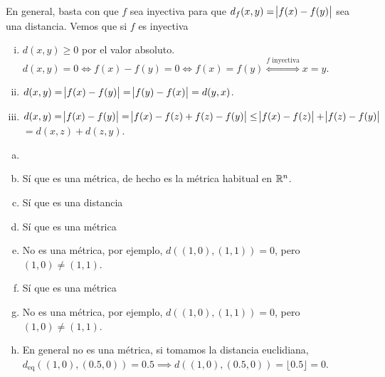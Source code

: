 \begin{eje}
    En general, basta con que $f$ sea inyectiva para que $d_f(x,y) = \abs{f(x) - f(y)}$ sea una distancia. Vemos que si $f$ es inyectiva
    \begin{enumerate}[i)]
        \item $d(x,y) \geq 0$ por el valor absoluto. $d(x, y) = 0 \iff f(x) - f(y) = 0 \iff f(x) = f(y) \stackrel{f \text{ inyectiva}}{\iff} x = y$.
        \item $d(x,y) = \abs{f(x) - f(y)} = \abs{f(y) - f(x)} = d(y,x)$.
        \item $d(x,y) = \abs{f(x) - f(y)} = \abs{f(x) - f(z) + f(z) - f(y)} \leq \abs{f(x) - f(z)} + \abs{f(z) - f(y)}$ $ = d(x, z) + d(z, y)$.
    \end{enumerate}
\end{eje}

\begin{eje}
    \begin{enumerate}[(a)]
        \item[]
        \item Sí que es una m\'etrica, de hecho es la m\'etrica habitual en $\mathbb{R}^n$.
            \begin{center}
                
            \end{center}
        \item Sí que es una distancia
            \begin{center}
                
            \end{center}
        \item Sí que es una m\'etrica
            \begin{center}
                
            \end{center}
        \item No es una m\'etrica, por ejemplo, $d\left( (1,0), (1,1) \right) = 0$, pero $(1,0) \neq (1,1)$.
        \item Sí que es una m\'etrica
            \begin{center}
                
            \end{center}
        \item No es una m\'etrica, por ejemplo, $d\left( (1,0), (1,1) \right) = 0$, pero $(1,0) \neq (1,1)$.
        \item En general no  es una m\'etrica, si tomamos la distancia euclidiana, $d_{\text{eq}} \left( (1, 0) , (0.5, 0) \right) = 0.5 \implies
            d\left( (1,0), (0.5, 0) \right) = \lfloor0.5 \rfloor = 0$.

\end{enumerate}
\end{eje}
